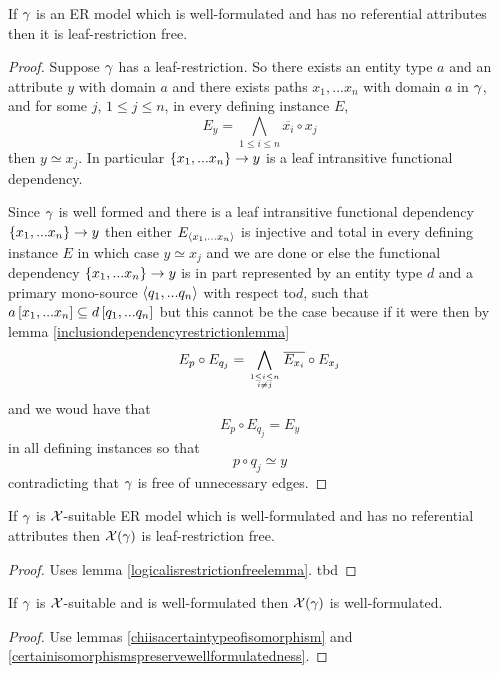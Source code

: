 \begin{lemma}
\label{logicalisrestrictionfreelemma}
If $\gamma$ is an ER model which is well-formulated and has no referential attributes 
then it is leaf-restriction free.
\end{lemma}
\begin{proof}
Suppose $\gamma$ has a leaf-restriction. So there exists an
entity type $a$ and an attribute $y$ with domain $a$ and there 
exists paths $x_1,...x_n$   with domain
$a$ in $\gamma$,  and for some $j$, $1 \leq j \leq n$, in every defining instance $E$,  
$$E_y = \bigwedge_{1 \leq i \leq n}{\overline{x_i}} \circ x_j$$then $y \simeq x_j$. In particular
$\left\{x_1,...x_n\right\} \rightarrow y$ is a leaf intransitive functional dependency. 

Since $\gamma$ is well formed  and there is a leaf intransitive functional dependency $\left\{x_1,...x_n\right\} \rightarrow y$ then either $E_{\langle x_1,...x_n\rangle}$ is injective and total in every defining instance $E$  in which case $y \simeq x_j$  and we are done  or else the functional dependency $\left\{x_1,...x_n\right\} \rightarrow y$   is in part represented by  an entity type $d$ and a primary mono-source $\langle q_1,...q_n\rangle$ with respect to$d$, such that $a\left[x_1,...x_n\right]\subseteq d\left[q_1,...q_n\right]$ but this cannot be the case because if it were then by lemma \ref{inclusiondependencyrestrictionlemma}
$$E_p \circ E_{q_j} = \bigwedge\limits_{\genfrac{}{}{0pt}{}{1 \leq i \leq n}{ i \neq j}}{\overline{E_{x_i}}}\circ E_{x_j}$$
and we woud have that
$$E_p \circ E_{q_j} = E_y$$
in all defining instances so that
$$p \circ q_j \simeq y$$
contradicting that $\gamma$ is free of unnecessary edges. 
\end{proof}

\begin{lemma}
\label{restrictioncarrythroughlemma}
If $\gamma$ is $\mathcal{X}$-suitable ER model which is well-formulated and has no referential attributes 
then $\mathcal{X}(\gamma)$ is leaf-restriction free.
\end{lemma}
\begin{proof}
Uses lemma  \ref{logicalisrestrictionfreelemma}.
\vspace{0.5cm}
tbd
\end{proof}



\begin{lemma}
\label{wfcarrythroughlemma}
If  $\gamma$ is $\mathcal{X}$-suitable and is well-formulated then  $\mathcal{X}(\gamma)$ is well-formulated. 
\end{lemma}
\begin{proof}
Use lemmas \ref{chiisacertaintypeofisomorphism} and \ref{certainisomorphismspreservewellformulatedness}.
\end{proof}


